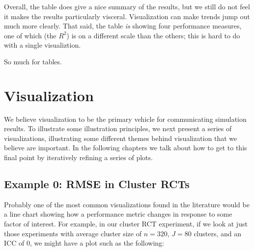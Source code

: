\documentclass[
]{book}
\begin{document}
Overall, the table does give a nice summary of the results, but we still do not feel it makes the results particularly visceral.
Visualization can make trends jump out much more clearly.
That said, the table \emph{is} showing four performance measures, one of which (the \(R^2\)) is on a different scale than the others; this is hard to do with a single visualiztion.

So much for tables.

\section{Visualization}\label{visualization}

We believe visualization to be the primary vehicle for communicating simulation results.
To illustrate some illustration principles, we next present a series of visualizations, illustrating some different themes behind visualization that we believe are important.
In the following chapters we talk about how to get to this final point by iteratively refining a series of plots.

\subsection{Example 0: RMSE in Cluster RCTs}\label{example-0-rmse-in-cluster-rcts}

Probably one of the most common visualizations found in the literature would be a line chart showing how a performance metric changes in response to some factor of interest.
For example, in our cluster RCT experiment, if we look at just those experiments with average cluster size of \(n=320\), \(J = 80\) clusters, and an ICC of 0, we might have a plot such as the following:
\end{document}
